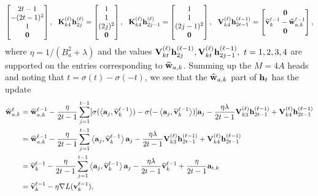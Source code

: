 \begin{align*}
\begin{bmatrix}
         2t-1\\-(2t-1)^2\\ 1\\{\mathbf 0}
    \end{bmatrix},~~ {\mathbf K}_{k4}^{(\ell)}{\mathbf h}^{(\ell)}_{2j}=\begin{bmatrix}
        1\\ 1 \\(2j)^2\\{\mathbf 0}
    \end{bmatrix},~~
{\mathbf K}_{k4}^{(\ell)}{\mathbf h}^{(\ell)}_{2j-1}=\begin{bmatrix}
        1\\ 1 \\(2j-1)^2\\{\mathbf 0}
    \end{bmatrix},~~ {\mathbf V}_{k4}^{(\ell)}{\mathbf h}^{(\ell-1)}_{2t-1}=\begin{bmatrix}
        {\mathbf 0}\\ \widehat{{\mathbf v}}^{\ell-1}_{k}-\widehat{{\mathbf w}}_{a,k}^{\ell-1}\\ {\mathbf 0}
    \end{bmatrix},
\end{align*}
where $\eta=1/(B_a^2+\lambda)$ and the values ${\mathbf V}_{kt}^{(\ell)}{\mathbf h}^{(\ell-1)}_{2j},{\mathbf V}_{kt}^{(\ell)}{\mathbf h}^{(\ell-1)}_{2j-1},~t=1,2,3,4$ are supported on the entries corresponding to $\widehat{{\mathbf w}}_{a,k}$.
Summing up the $M=4A$ heads and noting that $t=\sigma(t)-\sigma(-t)$, we see that the $\widehat{{\mathbf w}}_{a,k}$ part of ${\mathbf h}_t$ has the update
\begin{align*}
    \widehat{{\mathbf w}}_{a,k}^{\ell}
    &=
    \widehat{{\mathbf w}}_{a,k}^{\ell-1}-\frac{\eta}{2t-1}\sum_{j=1}^{t-1}[\sigma(\left\langle{\mathbf a}_j,\widehat{{\mathbf v}}_k^{\ell-1}\right\rangle)-\sigma(-\left\langle{\mathbf a}_j,\widehat{{\mathbf v}}_k^{\ell-1}\right\rangle)]{\mathbf a}_j-\frac{\eta\lambda}{2t-1}{\mathbf V}_{k3}^{(\ell)}{\mathbf h}^{(\ell-1)}_{2t-1}+{\mathbf V}_{k4}^{(\ell)}{\mathbf h}^{(\ell-1)}_{2t-1}\\
     &=
     \widehat{{\mathbf w}}_{a,k}^{\ell-1}-\frac{\eta}{2t-1}\sum_{j=1}^{t-1}\left\langle{\mathbf a}_j,\widehat{{\mathbf v}}_k^{\ell-1}\right\rangle{\mathbf a}_j-\frac{\eta\lambda}{2t-1}{\mathbf V}_{k3}^{(\ell)}{\mathbf h}^{(\ell-1)}_{2t-1}+{\mathbf V}_{k4}^{(\ell)}{\mathbf h}^{(\ell-1)}_{2t-1}\\
     &=
     \widehat{{\mathbf v}}_k^{\ell-1}-\frac{\eta}{2t-1}\sum_{j=1}^{t-1}\left\langle{\mathbf a}_j,\widehat{{\mathbf v}}_k^{\ell-1}\right\rangle{\mathbf a}_j-\frac{\eta\lambda}{2t-1}\widehat{{\mathbf v}}_k^{\ell-1}+\frac{\eta}{2t-1}{\mathbf a}_{t,k}\\
     &=\widehat{{\mathbf v}}_k^{\ell-1}-\eta\nabla L({\mathbf v}_k^{\ell-1}),
\end{align*}
